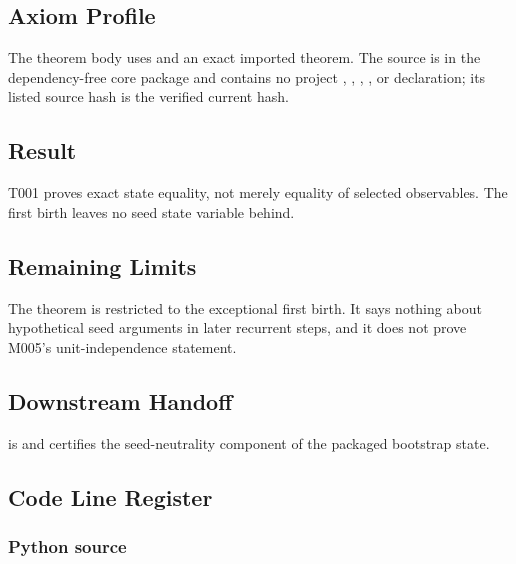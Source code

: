 \subsection{Axiom Profile}\label{axiom-profile-2}

The theorem body uses \texttt{\protect{}} and an exact imported theorem. The
source is in the dependency-free core package and contains no project
\texttt{\protect{}}, \texttt{\protect{}}, \texttt{\protect{}}, \texttt{\protect{}},
\texttt{\protect{}} or \texttt{\protect{}} declaration; its listed source hash
is the verified current hash.

\subsection{Result}\label{result-11}

T001 proves exact state equality, not merely equality of selected
observables. The first birth leaves no seed state variable behind.

\subsection{Remaining Limits}\label{remaining-limits-2}

The theorem is restricted to the exceptional first birth. It says
nothing about hypothetical seed arguments in later recurrent steps, and
it does not prove M005's unit-independence statement.

\subsection{Downstream Handoff}\label{downstream-handoff-11}

\texttt{\protect{}} is \texttt{\protect{}}
and certifies the seed-neutrality component of the packaged bootstrap
state.

\subsection{Code Line Register}\label{code-line-register-2}

\subsubsection{Python source}\label{python-source-10}

